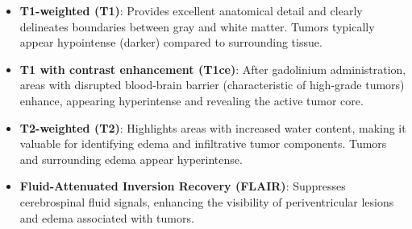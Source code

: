\begin{itemize}
  \item \textbf{T1-weighted (T1)}: Provides excellent anatomical detail and clearly delineates boundaries between gray and white matter. Tumors typically appear hypointense (darker) compared to surrounding tissue.


  \item \textbf{T1 with contrast enhancement (T1ce)}: After gadolinium administration, areas with disrupted blood-brain barrier (characteristic of high-grade tumors) enhance, appearing hyperintense and revealing the active tumor core.


  \item \textbf{T2-weighted (T2)}: Highlights areas with increased water content, making it valuable for identifying edema and infiltrative tumor components. Tumors and surrounding edema appear hyperintense.


  \item \textbf{Fluid-Attenuated Inversion Recovery (FLAIR)}: Suppresses cerebrospinal fluid signals, enhancing the visibility of periventricular lesions and edema associated with tumors.

\end{itemize}


